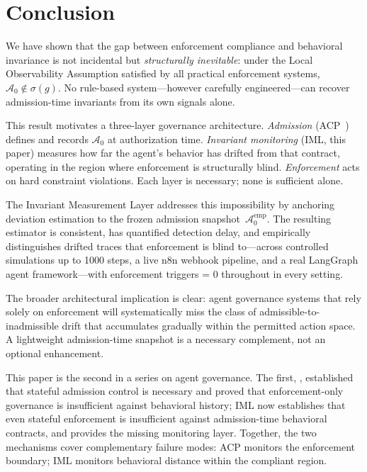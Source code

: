 \documentclass[11pt]{article}
\newcommand{\Azero}{\mathcal{A}_0}
\newcommand{\sigg}{\sigma(g)}
\begin{document}
\section{Conclusion}
\label{sec:conclusion}

We have shown that the gap between enforcement compliance and behavioral
invariance is not incidental but \emph{structurally inevitable}: under the
Local Observability Assumption satisfied by all practical enforcement systems,
$\Azero \notin \sigg$.  No rule-based system---however carefully
engineered---can recover admission-time invariants from its own signals alone.

This result motivates a three-layer governance architecture.
\emph{Admission} (ACP~\citep{fernandez2026acp}) defines and records
$\Azero$ at authorization time.
\emph{Invariant monitoring} (IML, this paper) measures how far the
agent's behavior has drifted from that contract, operating in the region
where enforcement is structurally blind.
\emph{Enforcement} acts on hard constraint violations.
Each layer is necessary; none is sufficient alone.

The Invariant Measurement Layer addresses this impossibility by anchoring
deviation estimation to the frozen admission snapshot~$\Azero^{\mathrm{emp}}$.
The resulting estimator is consistent, has quantified detection delay, and
empirically distinguishes drifted traces that enforcement is blind to---across
controlled simulations up to 1000 steps, a live n8n webhook pipeline, and a
real LangGraph agent framework---with enforcement triggers = 0 throughout in
every setting.

The broader architectural implication is clear: agent governance systems that
rely solely on enforcement will systematically miss the class of
admissible-to-inadmissible drift that accumulates gradually within the
permitted action space.  A lightweight admission-time snapshot is a necessary
complement, not an optional enhancement.

This paper is the second in a series on agent governance.  The first,
\citet{fernandez2026acp}, established that stateful admission control is
necessary and proved that enforcement-only governance is insufficient against
behavioral history; IML now establishes that even stateful enforcement is
insufficient against admission-time behavioral contracts, and provides the
missing monitoring layer.  Together, the two mechanisms cover complementary
failure modes: ACP monitors the enforcement boundary; IML monitors behavioral
distance within the compliant region.



\end{document}
